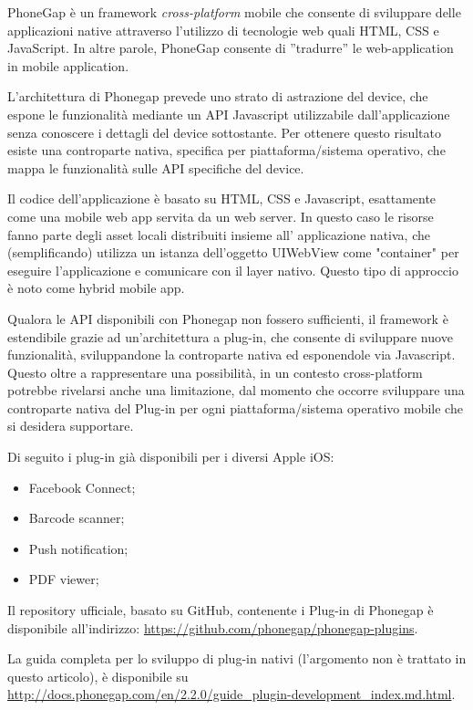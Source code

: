 \documentclass[10pt,a4paper,onecolumn]{article}
\begin{document}
	PhoneGap è un framework \textit{cross-platform} mobile che consente di sviluppare delle applicazioni native attraverso l'utilizzo di tecnologie web quali HTML, CSS e JavaScript. In altre parole, PhoneGap consente di ''tradurre'' le web-application in mobile application.
	
L'architettura di Phonegap prevede uno strato di astrazione del device, che espone le funzionalità mediante un API Javascript utilizzabile dall'applicazione senza conoscere i dettagli del device sottostante. Per ottenere questo risultato esiste una controparte nativa, specifica per piattaforma/sistema operativo, che mappa le funzionalità sulle API specifiche del device.

Il codice dell'applicazione è basato su HTML, CSS e Javascript, esattamente come una mobile web app servita da un web server. In questo caso le risorse fanno parte degli asset locali distribuiti insieme all' applicazione nativa, che (semplificando) utilizza un istanza dell'oggetto UIWebView come "container" per eseguire l'applicazione e comunicare con il layer nativo. Questo tipo di approccio è noto come hybrid mobile app.

Qualora le API disponibili con Phonegap non fossero sufficienti, il framework è estendibile grazie ad un'architettura a plug-in, che consente di sviluppare nuove funzionalità, sviluppandone la controparte nativa ed esponendole via Javascript. Questo oltre a rappresentare una possibilità, in un contesto cross-platform potrebbe rivelarsi anche una limitazione, dal momento che occorre sviluppare una controparte nativa del Plug-in per ogni piattaforma/sistema operativo mobile che si desidera supportare.

Di seguito i plug-in già disponibili per i diversi Apple iOS:

\begin{itemize}
	\item Facebook Connect;
	\item Barcode scanner;
	\item Push notification;
	\item PDF viewer;
\end{itemize}

Il repository ufficiale, basato su GitHub, contenente i Plug-in di Phonegap è disponibile all'indirizzo: \url{https://github.com/phonegap/phonegap-plugins}.

La guida completa per lo sviluppo di plug-in nativi (l'argomento non è trattato in questo articolo), è disponibile su \url{http://docs.phonegap.com/en/2.2.0/guide_plugin-development_index.md.html}.
\end{document}
